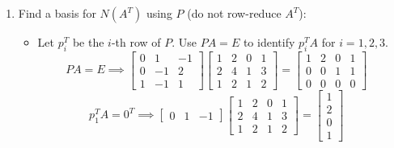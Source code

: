 \documentclass[9pt]{article}
\theoremstyle{plain}
\begin{document}
\begin{enumerate}
\[\begin{bmatrix}
			      1  & 0  \\
			      0  & -1 \\
			      0  & 1
		      \end{bmatrix}
	      \]
	\item[(e)] Find a basis for $N(A^{T})$ using $P$ (do not row-reduce $A^{T}$):
	      \begin{itemize}
		      \item[(i)] Let $p_{i}^{T}$ be the $i$-th row of $P$. Use $PA=E$ to identify $p_{i}^{T}A$ for $i=1,2,3$.
		            \[
			            PA=E \implies
			            \left[
				            \begin{array}{ccc}
					            0 & 1  & -1 \\
					            0 & -1 & 2  \\
					            1 & -1 & 1
				            \end{array}
				            \right]
			            \left[
				            \begin{array}{cccc}
					            1 & 2 & 0 & 1 \\
					            2 & 4 & 1 & 3 \\
					            1 & 2 & 1 & 2
				            \end{array}
				            \right] =
			            \left[
				            \begin{array}{cccc}
					            1 & 2 & 0 & 1 \\
					            0 & 0 & 1 & 1 \\
					            0 & 0 & 0 & 0
				            \end{array}
				            \right] \quad
		            \]
		            \[
			            p_1^TA=0^T \implies
			            \left[
				            \begin{array}{ccc}
					            0 & 1 & -1
				            \end{array}
				            \right]
			            \left[
				            \begin{array}{cccc}
					            1 & 2 & 0 & 1 \\
					            2 & 4 & 1 & 3 \\
					            1 & 2 & 1 & 2
				            \end{array}
				            \right] =
			            \left[
				            \begin{array}{c}
					            1 \\ 2 \\ 0 \\ 1
				            \end{array}
				            \right] \quad
		            \]


\end{itemize}
\end{enumerate}
\end{document}
